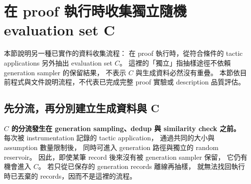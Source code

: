 
\section{在 proof 執行時收集獨立隨機 evaluation set C}
\label{sec:independent-random-evaluation-workflow}

本節說明另一種已實作的資料收集流程：\allowbreak
在 proof 執行時，\allowbreak 從符合條件的 tactic applications 另外抽出 evaluation set $C$。
這裡的「獨立」指抽樣途徑不依賴 generation sampler 的保留結果，\allowbreak
不表示 $C$ 與生成資料必然沒有重疊。
本節依目前程式與文件說明流程，\allowbreak 不代表已完成完整 proof 實驗或 description 品質評估。

\subsection{先分流，再分別建立生成資料與 C}

\textbf{$C$ 的分流發生在 generation sampling、dedup 與 similarity check 之前。}
每次被 instrumentation 記錄的 tactic application，\allowbreak
通過共同的大小與 assumption 數量限制後，\allowbreak
同時可進入 generation 路徑與獨立的 random reservoir。
因此，即使某筆 record 後來沒有被 generation sampler 保留，\allowbreak
它仍有機會進入 $C$。
若只從已保存的 generation records 離線再抽樣，\allowbreak
就無法找回執行時已丟棄的 records，\allowbreak 因而不是這裡的流程。

